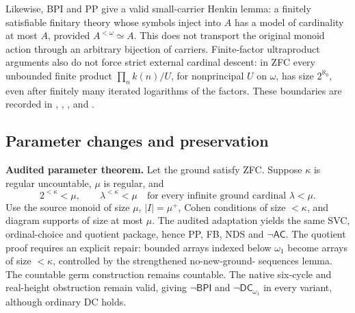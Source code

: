 Likewise, BPI and PP give a valid small-carrier Henkin lemma:
a finitely satisfiable finitary theory whose symbols inject into $A$
has a model of cardinality at most $A$, provided $A^{<\omega}\simeq A$.
This does not transport the original monoid action through an arbitrary
bijection of carriers. Finite-factor ultraproduct arguments also do
not force strict external cardinal descent: in ZFC every unbounded
finite product $\prod_n k(n)/U$, for nonprincipal $U$ on $\omega$,
has size $2^{\aleph_0}$, even after finitely many iterated logarithms
of the factors. These boundaries are recorded in
,
,
, and
.

\subsection{Parameter changes and preservation}

\textbf{Audited parameter theorem.}
Let the ground satisfy ZFC. Suppose $\kappa$ is regular uncountable,
$\mu$ is regular, and
\[
 2^{<\kappa}<\mu,\qquad
 \lambda^{<\kappa}<\mu\quad
 \text{for every infinite ground cardinal }\lambda<\mu.
\]
Use the source monoid of size $\mu$, $|I|=\mu^+$, Cohen conditions of
size $<\kappa$, and diagram supports of size at most $\mu$. The audited
adaptation yields the same SVC, ordinal-choice and quotient package,
hence PP, FB, NDS and $\neg\mathsf{AC}$. The quotient proof requires
an explicit repair: bounded arrays indexed below $\omega_1$ become
arrays of size $<\kappa$, controlled by the strengthened no-new-ground-
sequences lemma. The countable germ construction remains countable.
The native six-cycle and real-height obstruction remain valid, giving
$\neg\mathsf{BPI}$ and $\neg\mathsf{DC}_{\omega_1}$ in every variant,
although ordinary DC holds.

